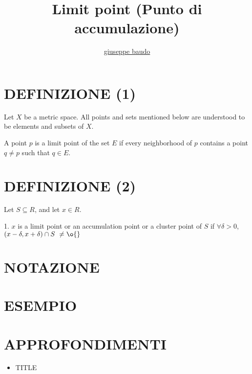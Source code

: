 \documentclass[a4paper,10pt]{article}
\title{Limit point (Punto di accumulazione)}
\author{\href{http://www.baudo.hol.es}{giuseppe baudo}}
\begin{document}
\maketitle

\section{DEFINIZIONE (1)}
Let $X$ be a metric space. All points and sets mentioned below are understood to be elements and subsets of $X$.

A point $p$ is a limit point of the set $E$ if every neighborhood of $p$ contains a point $q \ne p$ such that $q \in E$.

\section{DEFINIZIONE (2)}
Let $S \subseteq R$, and let $x \in R$.

1. $x$ is a limit point or an accumulation point or a cluster point of $S$ if $\forall \delta > 0$, $(x-\delta,x+\delta) \cap S \ \ne \o{}$

\section{NOTAZIONE}

\section{ESEMPIO}

\section{APPROFONDIMENTI}
\begin{itemize}
 \item TITLE
\end{itemize}
\end{document}
